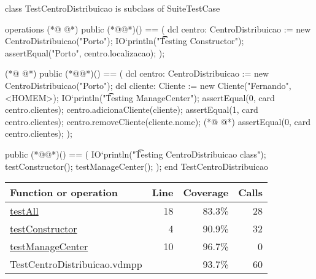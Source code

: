 \begin{vdmpp}[breaklines=true]
class TestCentroDistribuicao is subclass of SuiteTestCase

operations
(*@
\label{testConstructor:4}
@*)
  public (*@@*)() == (
    dcl centro: CentroDistribuicao := new CentroDistribuicao("Porto");
    IO`println("\t\t Testing Constructor");
    assertEqual("Porto", centro.localizacao);
  );
 
(*@
\label{testManageCenter:10}
@*)
 public (*@@*)()  == (
  dcl centro: CentroDistribuicao := new CentroDistribuicao("Porto");
  dcl cliente: Cliente := new Cliente("Fernando", <HOMEM>);
  IO`println("\t Testing ManageCenter");  
  assertEqual(0, card centro.clientes);
  centro.adicionaCliente(cliente);
  assertEqual(1, card centro.clientes);
  centro.removeCliente(cliente.nome);
(*@
\label{testAll:18}
@*)
  assertEqual(0, card centro.clientes);
);
 
  public (*@@*)() == (
    IO`println("\t Testing CentroDistribuicao class");
    testConstructor();
    testManageCenter();
  );
end TestCentroDistribuicao
\end{vdmpp}
\bigskip
\begin{longtable}{|l|r|r|r|}
\hline
Function or operation & Line & Coverage & Calls \\
\hline
\hline
\hyperref[testAll:18]{testAll} & 18&83.3\% & 28 \\
\hline
\hyperref[testConstructor:4]{testConstructor} & 4&90.9\% & 32 \\
\hline
\hyperref[testManageCenter:10]{testManageCenter} & 10&96.7\% & 0 \\
\hline
\hline
TestCentroDistribuicao.vdmpp & & 93.7\% & 60 \\
\hline
\end{longtable}

